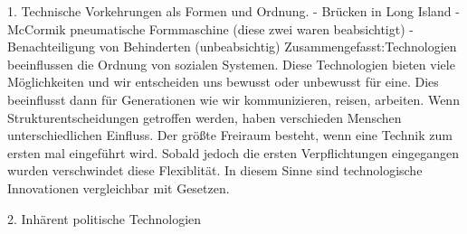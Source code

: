 \documentclass[10pt,a4paper]{article}
\begin{document}
1. Technische Vorkehrungen als Formen und Ordnung.
- Brücken in Long Island
- McCormik pneumatische Formmaschine (diese zwei waren beabsichtigt)
- Benachteiligung von Behinderten (unbeabsichtig)
Zusammengefasst:Technologien beeinflussen die Ordnung von sozialen Systemen. Diese Technologien bieten viele Möglichkeiten und wir entscheiden uns bewusst oder unbewusst für eine. Dies beeinflusst dann für Generationen wie wir kommunizieren, reisen, arbeiten. Wenn Strukturentscheidungen getroffen werden, haben verschieden Menschen unterschiedlichen Einfluss. Der größte Freiraum besteht, wenn eine Technik zum ersten mal eingeführt wird. Sobald jedoch die ersten Verpflichtungen eingegangen wurden verschwindet diese Flexiblität. In diesem Sinne sind technologische Innovationen vergleichbar mit Gesetzen.

2. Inhärent politische Technologien
\end{document}
